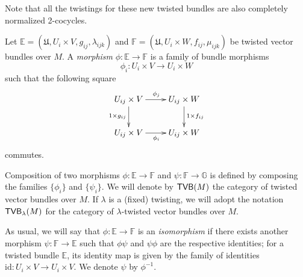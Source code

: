 \begin{obs}
Note that all the twistings for these new twisted bundles are also completely normalized 2-cocycles. 
\end{obs}

\begin{defi}
Let $\mathbb{E}=(\mathfrak{U},U_i\times V,g_{ij},\lambda_{ijk})$ and $\mathbb{F}=(\mathfrak{U},U_i\times W,f_{ij},\mu_{ijk})$ be twisted vector bundles over $M$. A \emph{morphism} $\phi :\mathbb{E}\to \mathbb{F}$ is a family of bundle morphisms
$$\phi_i:U_i\times V\longrightarrow U_i\times W$$
such that the following square
\begin{equation}\label{diag_tvbm}
\xymatrix{
U_{ij}\times V \ar[r]^{\phi_j} \ar[d]_{1\times g_{ij}} & U_{ij}\times W \ar[d]^{1\times f_{ij}} \\
U_{ij}\times V \ar[r]_{\phi_i} & U_{ij}\times W}
\end{equation}
commutes.
\end{defi}

Composition of two morphisms $\phi :\mathbb{E}\to \mathbb{F}$ and $\psi :\mathbb{F}\to \mathbb {G}$ is defined by composing the families $\{\phi_i\}$ and $\{\psi_i\}$. We will denote by $\mathsf{TVB}(M)$ the category of twisted vector bundles over $M$. If $\lambda$ is a (fixed) twisting, we will adopt the notation $\mathsf{TVB}_{\lambda}(M)$ for the category of $\lambda$-twisted vector bundles over $M$.

As usual, we will say that $\phi :\mathbb{E}\to \mathbb{F}$ is an \emph{isomorphism} if there exists another morphism $\psi :\mathbb{F}\to \mathbb{E}$ such that $\phi \psi$ and $\psi \phi$ are the respective identities; for a twisted bundle $\mathbb{E}$, its identity map is given by the family of identities $\text{id}:U_i\times V\to U_i\times V$. We denote $\psi$ by $\phi^{-1}$.


